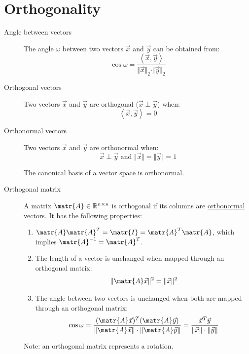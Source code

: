 \section{Orthogonality}
\begin{description}
    \item[Angle between vectors] 
        The angle $\omega$ between two vectors $\vec{x}$ and $\vec{y}$ can be obtained from:
        \begin{equation*}
            \cos\omega = \frac{\left\langle \vec{x}, \vec{y} \right\rangle }{\Vert \vec{x} \Vert_2 \cdot \Vert \vec{y} \Vert_2}
        \end{equation*}
    
    \item[Orthogonal vectors] 
        Two vectors $\vec{x}$ and $\vec{y}$ are orthogonal ($\vec{x} \perp \vec{y}$) when:
        \[ \left\langle \vec{x}, \vec{y} \right\rangle = 0 \]
    
    \item[Orthonormal vectors] 
        Two vectors $\vec{x}$ and $\vec{y}$ are orthonormal when:
        \[ \vec{x} \perp \vec{y} \text{ and } \Vert \vec{x} \Vert = \Vert \vec{y} \Vert=1 \]
        \begin{theorem}
            The canonical basis of a vector space is orthonormal.
        \end{theorem}
    
    \item[Orthogonal matrix] 
        A matrix $\matr{A} \in \mathbb{R}^{n \times n}$ is orthogonal if its columns are \underline{orthonormal} vectors.
        It has the following properties:
        \begin{enumerate}
            \item $\matr{A}\matr{A}^T = \matr{I} = \matr{A}^T\matr{A}$, which implies $\matr{A}^{-1} = \matr{A}^T$.
            \item The length of a vector is unchanged when mapped through an orthogonal matrix: 
                \[ \Vert \matr{A}\vec{x} \Vert^2 = \Vert \vec{x} \Vert^2 \]
            \item The angle between two vectors is unchanged when both are mapped through an orthogonal matrix:
                \[ 
                    \cos\omega = \frac{(\matr{A}\vec{x})^T(\matr{A}\vec{y})}{\Vert \matr{A}\vec{x} \Vert \cdot \Vert \matr{A}\vec{y} \Vert} = 
                        \frac{\vec{x}^T\vec{y}}{\Vert \vec{x} \Vert \cdot \Vert \vec{y} \Vert}
                \]
        \end{enumerate}
        Note: an orthogonal matrix represents a rotation.


\end{description}
